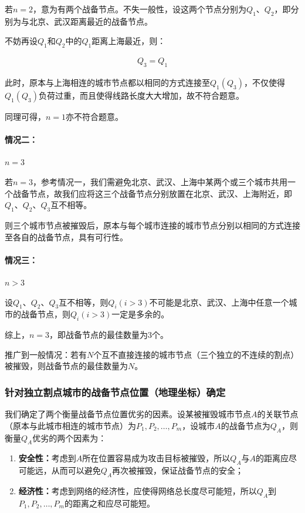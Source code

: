 \documentclass{article}
\begin{document}
若$n=2$，意为有两个战备节点。不失一般性，设这两个节点分别为$Q_1$、$Q_2$，即分别为与北京、武汉距离最近的战备节点。

不妨再设$Q_1$和$Q_2$中的$Q_1$距离上海最近，则：

\begin{align}
	Q_3=Q_1
\end{align}

此时，原本与上海相连的城市节点都以相同的方式连接至$Q_1(Q_3)$，不仅使得$Q_1(Q_3)$负荷过重，而且使得线路长度大大增加，故不符合题意。

同理可得，$n=1$亦不符合题意。

\paragraph{情况二：}%
\label{par:情况二：}

$n=3$

若$n=3$，参考情况一，我们需避免北京、武汉、上海中某两个或三个城市共用一个战备节点，故我们应将这三个战备节点分别放置在北京、武汉、上海附近，即$Q_1$、$Q_2$、$Q_3$互不相等。

则三个城市节点被摧毁后，原本与每个城市连接的城市节点分别以相同的方式连接至各自的战备节点，具有可行性。

\paragraph{情况三：}%
\label{par:情况三：}

$n>3$

设$Q_1$、$Q_2$、$Q_3$互不相等，则$Q_i(i>3)$不可能是北京、武汉、上海中任意一个城市的战备节点，则$Q_i(i>3)$一定是多余的。

综上，$n=3$，即战备节点的最佳数量为3个。

推广到一般情况：若有$N$个互不直接连接的城市节点（三个独立的不连续的割点）被摧毁，则战备节点的最佳数量为$N$。

\subsubsection{针对独立割点城市的战备节点位置（地理坐标）确定}
\label{ssub:针对独立割点城市的战备节点位置（地理坐标）确定}

我们确定了两个衡量战备节点位置优劣的因素。设某被摧毁城市节点$A$的关联节点（原本与此城市相连的城市节点）为$P_1,P_2,\dots,P_m$，设城市$A$的战备节点为$Q_A$，则衡量$Q_A$优劣的两个因素为：

\begin{enumerate}
	\item \textbf{安全性：}考虑到$A$所在位置容易成为攻击目标被摧毁，所以$Q_A$与$A$的距离应尽可能远，从而可以避免$Q_A$再次被摧毁，保证战备节点的安全；
	\item \textbf{经济性：}考虑到网络的经济性，应使得网络总长度尽可能短，所以$Q_A$到$P_1,P_2,\dots,P_m$的距离之和应尽可能短。
\end{enumerate}
\end{document}
